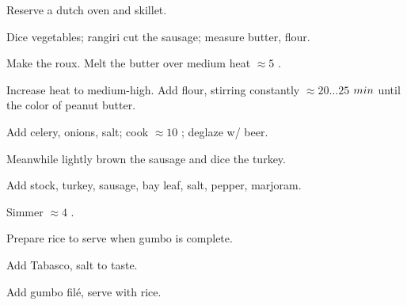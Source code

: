 \begin{preparation}
\item Reserve a dutch oven and skillet.

\item Dice vegetables; rangiri cut the sausage; measure butter, flour.

\item Make the roux.
	Melt the butter over medium heat $\approx 5$ \minute.

\item Increase heat to medium-high.
	Add flour, stirring constantly $\approx 20 \ldots 25$ $\minute$ until the color of peanut butter.

\item Add celery, onions, salt; cook $\approx 10$ \minute; deglaze w/ beer.

\item Meanwhile lightly brown the sausage and dice the turkey.

\item Add stock, turkey, sausage, bay leaf, salt, pepper, marjoram.

\item Simmer $\approx 4$ \hour.

\item Prepare rice to serve when gumbo is complete.

\item Add Tabasco, salt to taste.

\item Add gumbo fil\'{e}, serve with rice.
\end{preparation}


\recipeend%
